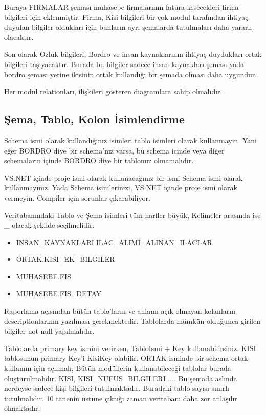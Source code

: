 \documentclass[10pt,a4paper,draft]{article}
\begin{document}
Buraya FIRMALAR şeması muhasebe firmalarının fatura kesecekleri firma bilgileri için eklenmiştir.
Firma, Kisi bilgileri bir çok modul tarafından ihtiyaç duyulan bilgiler oldukları için bunların
ayrı şemalarda tutulmaları daha yararlı olacaktır.

Son olarak Ozluk bilgileri, Bordro ve insan kaynaklarının ihtiyaç duydukları ortak bilgileri taşıyacaktır.
Burada bu bilgiler sadece insan kaynakları şeması yada bordro şeması yerine ikisinin ortak kullandığı
bir şemada olması daha uygundur.

Her modul relationları, ilişkileri gösteren diagramlara sahip olmalıdır.



\subsection{Şema, Tablo, Kolon İsimlendirme}

Schema ismi olarak kullandığınız isimleri tablo isimleri olarak kullanmayın. 
Yani eğer BORDRO diye bir schema'nız varsa,	bu schema icinde veya 
diğer schemaların içinde BORDRO diye bir tablonuz olmamalıdır.


VS.NET içinde proje ismi olarak kullanacağınız bir ismi Schema ismi  olarak kullanmayınız.
Yada Schema isimlerinizi, VS.NET içinde	proje ismi  olarak vermeyin.
Compiler için sorunlar çıkarabiliyor.		 


Veritabanındaki Tablo ve Şema isimleri tüm harfler büyük, Kelimeler arasında ise \_ olacak şekilde seçilmelidir.

\begin{itemize}
\item INSAN\_KAYNAKLARI.ILAC\_ALIMI\_ALINAN\_ILACLAR		 
\item ORTAK.KISI\_EK\_BILGILER		 
\item MUHASEBE.FIS		 
\item MUHASEBE.FIS\_DETAY 

\end{itemize}




Raporlama açısından bütün tablo'ların ve anlamı açık olmayan kolanların 
  descriptionlarının yazılması gerekmektedir.		 
  			Tablolarda mümkün olduğunca girilen bilgiler not null yapılmalıdır.
  		 
  			Tablolarda primary key ismini verirken, TabloIsmi + Key 
  kullanabilirsiniz. KISI tablosunun primary Key'i KisiKey olabilir.		 
  			ORTAK isminde bir schema ortak kullanım için açılmalı, Bütün modüllerin 
  kullanabileceği tablolar burada oluşturulmalıdır.			KISI, KISI\_NUFUS\_BILGILERI 
  .... Bu şemada aslında nerdeyse sadece kişi bilgileri tutulmaktadır.
  Buradaki tablo sayısı sınırlı tutulmalıdır. 10 tanenin üstüne çıktığı zaman
  veritabanı daha zor anlaşılır olmaktadır.
  
\end{document}
